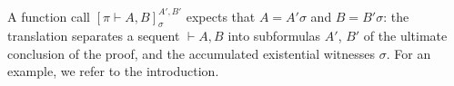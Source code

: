 \documentclass[twoside,a4paper]{article}
\makeatletter
\newcommand\defn[1]{\textit{\textbf{#1}}}
\newcommand\ex[2][{}]{\textsc{ev}_{#1}(#2)}
\newcommand\dom[1]{\textsc{dom}(#1)}
\newcommand\+{+}
\renewcommand\*{\times}
\newcommand\dual[1]{\overline{#1}}
\newcommand\sub{\leq}
\newcommand\seq[2]{{\vdash}#1,#2}
\newcommand\prf[3]{#1\vdash\!#2,#3}
\newcommand\deseq[4][\sigma]{[#2]_{#1}^{#3,#4}}
\newcommand\res[1]{|_{#1}}
\newcommand\link[3][\sigma]{(#2,#3)_{#1}}
\newcommand\qrr[1]{
  \ifx#1+\expandafter\@qrr\else
  \ifx#1*\*\mathrm R\else
  \ifx#1!\forall\mathrm R\else
  \ifx#1?\expandafter\@@qrr\else
  \ifx#11\mathrm{ax}\else
  \ifx#1.\mathrm{cut}\else
  #1\mathrm R
  \fi\fi\fi\fi\fi\fi
}
\newcommand\@qrr[1]{+\mathrm R,#1}
\newcommand\@@qrr[1]{\exists\mathrm R,#1}
\makeatother
\begin{document}
A function call $\deseq{\prf\pi AB}{A'}{B'}$ expects that $A=A'\sigma$ and $B=B'\sigma$: the translation separates a sequent $\seq AB$ into subformulas $A'$, $B'$ of the ultimate conclusion of the proof, and the accumulated existential witnesses $\sigma$. For an example, we refer to the introduction.
%
%
%

\end{document}
